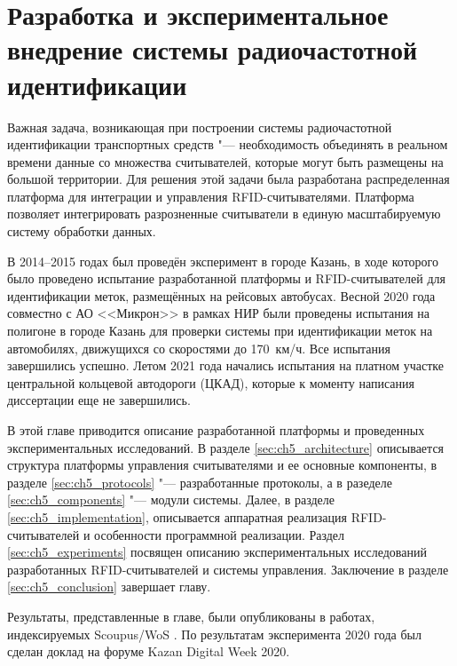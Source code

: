 \chapter{Разработка и экспериментальное внедрение системы радиочастотной идентификации}\label{ch:ch5}
Важная задача, возникающая при построении системы радиочастотной идентификации транспортных средств "--- необходимость объединять в реальном времени данные со множества считывателей, которые могут быть размещены на большой территории. Для решения этой задачи была разработана распределенная платформа для интеграции и управления RFID-считывателями. Платформа позволяет интегрировать разрозненные считыватели в единую масштабируемую систему обработки данных.

В 2014--2015 годах был проведён эксперимент в городе Казань, в ходе которого было проведено испытание разработанной платформы и RFID-считывателей для идентификации меток, размещённых на рейсовых автобусах. Весной 2020 года совместно с АО <<Микрон>> в рамках НИР были проведены испытания на полигоне в городе Казань для проверки системы при идентификации меток на автомобилях, движущихся со скоростями до 170~км/ч. Все испытания завершились успешно. Летом 2021 года начались испытания на платном участке центральной кольцевой автодороги (ЦКАД), которые к моменту написания диссертации еще не завершились.

В этой главе приводится описание разработанной платформы и проведенных экспериментальных исследований. В разделе \ref{sec:ch5_architecture} описывается структура платформы управления считывателями и ее основные компоненты, в разделе \ref{sec:ch5_protocols} "--- разработанные протоколы, а в разеделе \ref{sec:ch5_components} "--- модули системы. Далее, в разделе \ref{sec:ch5_implementation}, описывается аппаратная реализация RFID-считывателей и особенности программной реализации. Раздел \ref{sec:ch5_experiments} посвящен описанию экспериментальных исследований разработанных RFID-считывателей и системы управления. Заключение в разделе \ref{sec:ch5_conclusion} завершает главу.

Результаты, представленные в главе, были опубликованы в работах, индексируемых Scoupus/WoS \cite{RFIDCTRL_NETS2CARS2014, RFIDTA2012}. По результатам эксперимента 2020 года был сделан доклад на форуме Kazan Digital Week 2020.


